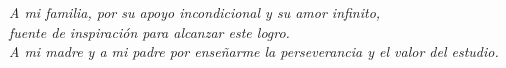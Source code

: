\vfill 

\begin{center}
    \textit{A mi familia, por su apoyo incondicional y su amor infinito,}\\
    \textit{fuente de inspiración para alcanzar este logro.}\\
    \vspace{0.5cm}
    \textit{A mi madre y a mi padre por enseñarme la perseverancia y el valor del estudio.}    
\end{center}

\vfill
